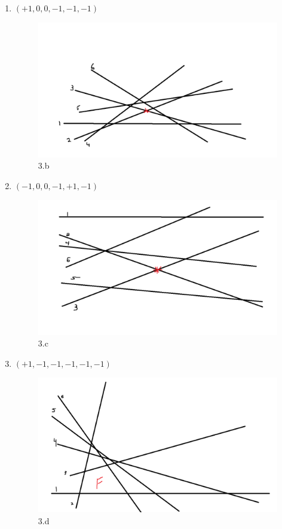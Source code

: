 \documentclass[11pt]{article}
\begin{document}
\begin{enumerate}
\begin{enumerate}
        \item $(+1, 0, 0, -1, -1, -1)$
        \begin{figure}[H]
            \centering
            \includegraphics[scale = 0.25]{3_1_b.png}
            \caption{3.b}
        \end{figure}
        \item $(-1, 0, 0, -1, +1, -1)$
        \begin{figure}[H]
            \centering
            \includegraphics[scale = 0.25]{3_1_c.png}
            \caption{3.c}
        \end{figure}
        \item $(+1, -1, -1, -1, -1, -1)$
        
        \begin{figure}[H]
            \centering
            \includegraphics[scale = 0.25]{3_1_d.png}
            \caption{3.d}
        \end{figure}


\end{enumerate}
\end{enumerate}
\end{document}
